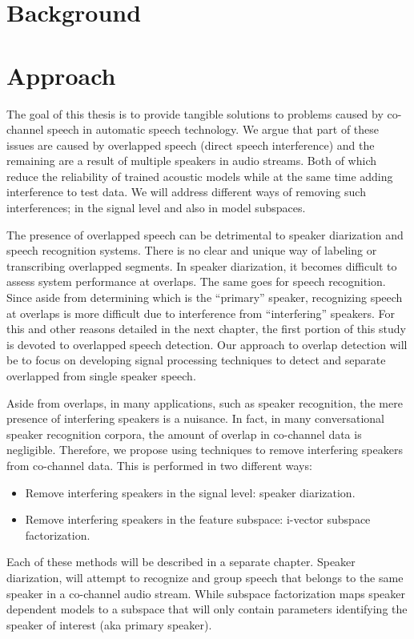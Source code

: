 \section{Background}
\label{sec:background}



\section{Approach}

The goal of this thesis is to provide tangible solutions to problems caused by co-channel speech in automatic speech technology. 
We argue that part of these issues are caused by overlapped speech (direct speech interference) and the remaining are a result of multiple speakers in audio streams. 
Both of which reduce the reliability of trained acoustic models while at the same time adding interference to test data. 
We will address different ways of removing such interferences; in the signal level and also in model subspaces. 

The presence of overlapped speech can be detrimental to speaker diarization and speech recognition systems. 
There is no clear and unique way of labeling or transcribing overlapped segments. 
In speaker diarization, it becomes difficult to assess system performance at overlaps. 
The same goes for speech recognition. 
Since aside from determining which is the ``primary'' speaker, recognizing speech at overlaps is more difficult due to interference from ``interfering'' speakers. 
For this and other reasons detailed in the next chapter, the first portion of this study is devoted to overlapped speech detection. 
Our approach to overlap detection will be to focus on developing signal processing techniques to detect and separate overlapped from single speaker speech. 

Aside from overlaps, in many applications, such as speaker recognition, the mere presence of interfering speakers is a nuisance. 
In fact, in many conversational speaker recognition corpora, the amount of overlap in co-channel data is negligible. 
Therefore, we propose using techniques to remove interfering speakers from co-channel data. 
This is performed in two different ways: 
\begin{itemize}
\item Remove interfering speakers in the signal level: speaker diarization.
\item Remove interfering speakers in the feature subspace: i-vector subspace factorization.
\end{itemize}

Each of these methods will be described in a separate chapter. 
Speaker diarization, will attempt to recognize and group speech that belongs to the same speaker in a co-channel audio stream. 
While subspace factorization maps speaker dependent models to a subspace that will only contain parameters identifying the speaker of interest (aka primary speaker). 


 
